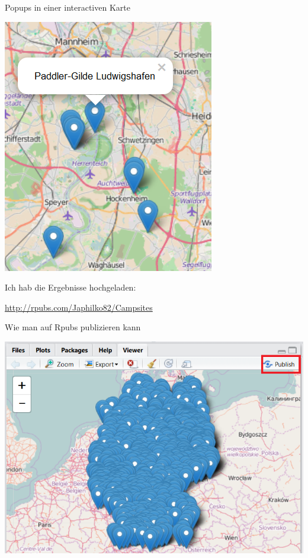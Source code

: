 \documentclass[ignorenonframetext,]{beamer}
\begin{document}
\begin{frame}{Popups in einer interactiven Karte}

\includegraphics{figure/Camping_Mannheim.PNG}

Ich hab die Ergebnisse hochgeladen:

\url{http://rpubs.com/Japhilko82/Campsites}

\end{frame}

\begin{frame}{Wie man auf Rpubs publizieren kann}

\includegraphics{figure/PublishCampSitesGermany.PNG}

\end{frame}
\end{document}
